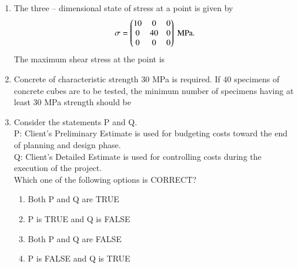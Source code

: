 \documentclass[journal]{IEEEtran}
\begin{document}
\begin{enumerate}
\item The three -- dimensional state of stress at a point is given by  
\begin{align}
\sigma = \myvec{$10$ & $0$ & $0$ \\ $0$ & $40$ & $0$ \\ $0$ & $0$ & $0$} \text{ MPa}. 
\end{align}
The maximum shear stress at the point is  
\hfill {}  
\begin{enumerate}
\end{enumerate}

\item Concrete of characteristic strength $30$ MPa is required. If $40$ specimens of concrete cubes are to be tested, the minimum number of specimens having at least $30$ MPa strength should be  
\hfill {}  
\begin{enumerate}
\end{enumerate}

\item Consider the statements P and Q.  \\
P: Client's Preliminary Estimate is used for budgeting costs toward the end of planning and design phase.  \\
Q: Client's Detailed Estimate is used for controlling costs during the execution of the project.  \\
Which one of the following options is CORRECT?  
\hfill {}  
\begin{enumerate}
\item Both P and Q are TRUE
\item P is TRUE and Q is FALSE
\item Both P and Q are FALSE
\item P is FALSE and Q is TRUE
\end{enumerate}


\end{enumerate}
\end{document}
